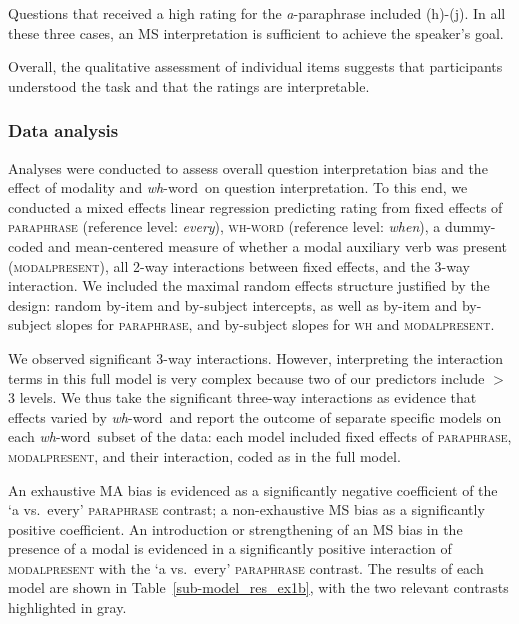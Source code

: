 \documentclass[12pt,letterpaper,table,svgnames,dvipsnames]{article}
\newcommand{\tableref}[1]{Table~\ref{#1}}
\newcommand{\whw}{\emph{wh}-word~}
\begin{document}
Questions that received a high rating for the \emph{a}-paraphrase included (h)-(j). In all these three cases, an MS interpretation is sufficient to achieve the speaker's goal.

Overall, the qualitative assessment of individual items suggests that participants understood the task and that the ratings are interpretable.




\subsubsection{Data analysis}
Analyses were conducted to assess overall question interpretation bias and the effect of modality and \whw on question interpretation. To this end, we conducted a mixed effects linear regression predicting rating from fixed effects of \textsc{paraphrase} (reference level: \emph{every}), \textsc{wh-word} (reference level: \emph{when}), a dummy-coded and mean-centered measure of whether a modal auxiliary verb was present (\textsc{modalpresent}), all 2-way interactions between fixed effects, and the 3-way interaction. We included the maximal random effects structure justified by the design: random by-item and by-subject intercepts, as well as by-item and by-subject slopes for \textsc{paraphrase}, and by-subject slopes for \textsc{wh} and \textsc{modalpresent}. 

We observed significant 3-way interactions. %
However, interpreting the interaction terms in this full model is very complex because two of our predictors include $>$ 3 levels. We thus take the significant three-way interactions as evidence that effects varied by \whw and  report the outcome of separate specific models on each \whw subset of the data: each model included fixed effects of \textsc{paraphrase}, \textsc{modalpresent}, and their interaction, coded as in the full model. 

An exhaustive MA bias is evidenced as a significantly negative coefficient of the `a vs.~every' \textsc{paraphrase} contrast; a non-exhaustive MS bias as a significantly positive coefficient. An introduction or strengthening of an MS bias in the presence of a modal is evidenced in a significantly positive interaction of \textsc{modalpresent} with the `a vs.~every' \textsc{paraphrase} contrast. The results of each model are shown in \tableref{sub-model_res_ex1b}, with the two relevant contrasts highlighted in gray.
\end{document}
